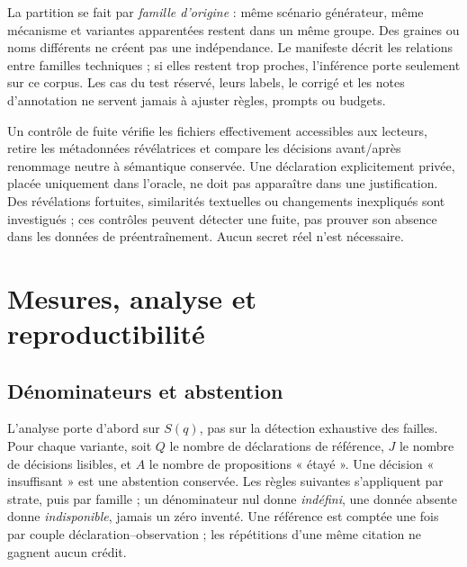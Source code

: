 \documentclass[11pt,a4paper]{article}
\begin{document}
La partition se fait par \emph{famille d'origine} : même scénario générateur,
même mécanisme et variantes apparentées restent dans un même groupe. Des graines
ou noms différents ne créent pas une indépendance. Le manifeste décrit les
relations entre familles techniques ; si elles restent trop proches, l'inférence
porte seulement sur ce corpus. Les cas du test réservé, leurs labels, le corrigé
et les notes d'annotation ne servent jamais à ajuster règles, prompts ou budgets.

Un contrôle de fuite vérifie les fichiers effectivement accessibles aux lecteurs,
retire les métadonnées révélatrices et compare les décisions avant/après
renommage neutre à sémantique conservée. Une déclaration explicitement privée,
placée uniquement dans l'oracle, ne doit pas apparaître dans une justification.
Des révélations fortuites, similarités textuelles ou changements inexpliqués sont
investigués ; ces contrôles peuvent détecter une fuite, pas prouver son absence
dans les données de préentraînement. Aucun secret réel n'est nécessaire.

\section{Mesures, analyse et reproductibilité}
\subsection{Dénominateurs et abstention}
L'analyse porte d'abord sur $S(q)$, pas sur la détection exhaustive des failles.
Pour chaque variante, soit $Q$ le nombre de déclarations de référence, $J$ le
nombre de décisions lisibles, et $A$ le nombre de propositions « étayé ».
Une décision « insuffisant » est une abstention conservée. Les règles suivantes
s'appliquent par strate, puis par famille ; un dénominateur nul donne
\emph{indéfini}, une donnée absente donne \emph{indisponible}, jamais un zéro inventé.
Une référence est comptée une fois par couple déclaration--observation ;
les répétitions d'une même citation ne gagnent aucun crédit.
\end{document}
